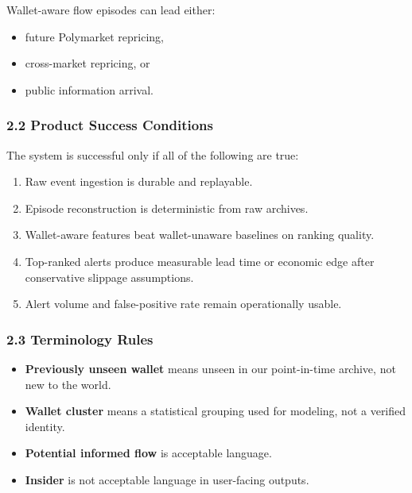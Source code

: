 \documentclass[
]{article}
\providecommand{\tightlist}{%
  \setlength{\itemsep}{0pt}\setlength{\parskip}{0pt}}
\begin{document}
Wallet-aware flow episodes can lead either:

\begin{itemize}
\tightlist
\item
  future Polymarket repricing,
\item
  cross-market repricing, or
\item
  public information arrival.
\end{itemize}

\subsubsection{2.2 Product Success
Conditions}\label{22-product-success-conditions}

The system is successful only if all of the following are true:

\begin{enumerate}
\def\labelenumi{\arabic{enumi}.}
\tightlist
\item
  Raw event ingestion is durable and replayable.
\item
  Episode reconstruction is deterministic from raw archives.
\item
  Wallet-aware features beat wallet-unaware baselines on ranking
  quality.
\item
  Top-ranked alerts produce measurable lead time or economic edge after
  conservative slippage assumptions.
\item
  Alert volume and false-positive rate remain operationally usable.
\end{enumerate}

\subsubsection{2.3 Terminology Rules}\label{23-terminology-rules}

\begin{itemize}
\tightlist
\item
  \textbf{Previously unseen wallet} means unseen in our point-in-time
  archive, not new to the world.
\item
  \textbf{Wallet cluster} means a statistical grouping used for
  modeling, not a verified identity.
\item
  \textbf{Potential informed flow} is acceptable language.
\item
  \textbf{Insider} is not acceptable language in user-facing outputs.
\end{itemize}
\end{document}
